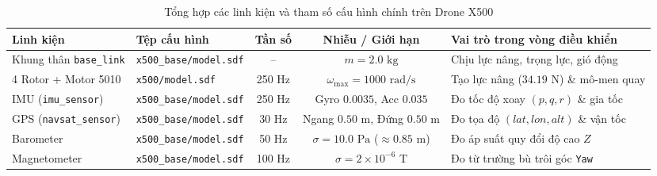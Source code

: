 \documentclass[11pt,a4paper]{article}
\begin{document}
\vspace{1.2em}
\noindent
\begin{table}[h!]
\centering
\caption{Tổng hợp các linh kiện và tham số cấu hình chính trên Drone X500}
\small
\begin{tabularx}{\textwidth}{@{}llccX@{}}
\toprule
\textbf{Linh kiện} & \textbf{Tệp cấu hình} & \textbf{Tần số} & \textbf{Nhiễu / Giới hạn} & \textbf{Vai trò trong vòng điều khiển} \\
\midrule
Khung thân \texttt{base\_link} & \texttt{x500\_base/model.sdf} & -- & $m = 2.0\text{ kg}$ & Chịu lực nâng, trọng lực, gió động \\
4 Rotor + Motor 5010 & \texttt{x500/model.sdf} & 250 Hz & $\omega_{\max}=1000\text{ rad/s}$ & Tạo lực nâng ($34.19\text{ N}$) \& mô-men quay \\
IMU (\texttt{imu\_sensor}) & \texttt{x500\_base/model.sdf} & 250 Hz & Gyro $0.0035$, Acc $0.035$ & Đo tốc độ xoay $(p,q,r)$ \& gia tốc \\
GPS (\texttt{navsat\_sensor}) & \texttt{x500\_base/model.sdf} & 30 Hz & Ngang $0.50\text{ m}$, Đứng $0.50\text{ m}$ & Đo tọa độ $(lat,lon,alt)$ \& vận tốc \\
Barometer & \texttt{x500\_base/model.sdf} & 50 Hz & $\sigma = 10.0\text{ Pa}$ ($\approx 0.85\text{ m}$) & Đo áp suất quy đổi độ cao $Z$ \\
Magnetometer & \texttt{x500\_base/model.sdf} & 100 Hz & $\sigma = 2\times 10^{-6}\text{ T}$ & Đo từ trường bù trôi góc \texttt{Yaw} \\
\bottomrule
\end{tabularx}
\end{table}
\end{document}
